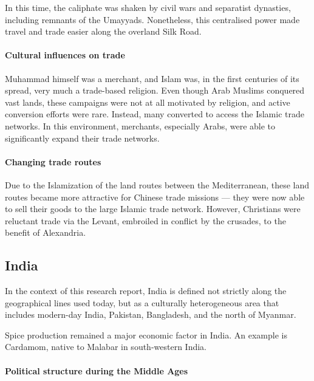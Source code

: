\documentclass[11pt, a4paper, headings=standardclasses]{scrartcl}
\begin{document}
In this time, the caliphate was shaken by civil wars and separatist dynasties, including remnants of the Umayyads.\autocite[Section \textit{End}]{Umayyad} Nonetheless, this centralised power made travel and trade easier along the overland Silk Road.

\paragraph{Cultural influences on trade}

Muhammad himself was a merchant\autocite{Muhammad}, and Islam was, in the first centuries of its spread, very much a trade-based religion. Even though Arab Muslims conquered vast lands, these campaigns were not at all motivated by religion\autocite[200]{Lapidus}, and active conversion efforts were rare. Instead, many converted to access the Islamic trade networks.\autocite{SilkRoadIslam} In this environment, merchants, especially Arabs, were able to significantly expand their trade networks.

\paragraph{Changing trade routes}

Due to the Islamization of the land routes between the Mediterranean, these land routes became more attractive for Chinese trade missions --- they were now able to sell their goods to the large Islamic trade network. However, Christians were reluctant trade via the Levant, embroiled in conflict by the crusades, to the benefit of Alexandria.\autocite[Paragraph 5]{UN}

\subsection{India}

In the context of this research report, India is defined not strictly along the geographical lines used today, but as a culturally heterogeneous area that includes modern-day India, Pakistan, Bangladesh, and the north of Myanmar.

Spice production remained a major economic factor in India. An example is Cardamom, native to Malabar in south-western India.\autocite[71]{Rome}

\paragraph{Political structure during the Middle Ages}
\end{document}
